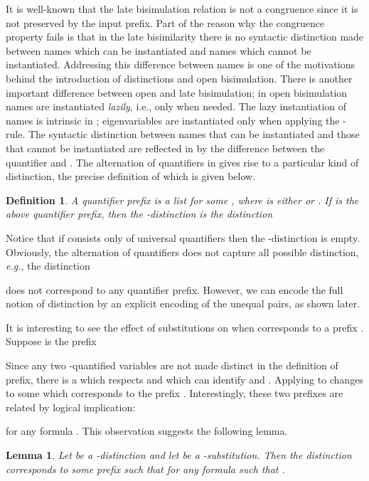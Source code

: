 \documentclass{acmtrans2m}
\newenvironment{definition}{\begin{define} \rm}{\end{define}}
\newtheorem{define}[theorem]{Definition}
\newtheorem{lemma}[theorem]{Lemma}
\begin{document}
It is well-known that the late bisimulation relation is
not a congruence since it is not preserved by the input prefix.
Part of the reason why the congruence property fails 
is that in the late bisimilarity there is no syntactic distinction
made between names which can be instantiated and names which cannot be
instantiated. 
Addressing this difference between names
is one of the motivations behind the introduction 
of distinctions and open bisimulation. 
There is another important
difference between open and late bisimulation; in open bisimulation
names are instantiated {\em lazily}, i.e., only when needed. 
The lazy instantiation of
names is intrinsic in ; eigenvariables are instantiated
only when applying the -rule. 
The syntactic distinction between names that can be instantiated and 
those that cannot be instantiated are reflected in  by the difference between 
the quantifier  and . 
The alternation of quantifiers in  gives rise to
a particular kind of distinction, the precise definition of which
is given below.

\begin{definition}
A {\em quantifier prefix} 
is a list  for some ,
where  is either  or .
If  is the above quantifier prefix, then the
{\em -distinction} is the distinction

\end{definition}
Notice that if  consists only of universal quantifiers
then the -distinction is empty.  Obviously, the
alternation of quantifiers does not capture all possible distinction,
{\em e.g.}, the distinction 

does not correspond to any quantifier prefix.  However, we can encode
the full notion of distinction by an explicit encoding of the unequal
pairs, as shown later.

It is interesting to see the effect of  substitutions on 
when  corresponds to a prefix . 
Suppose  is the prefix 

Since any two -quantified
variables are not made distinct in the definition of  prefix,
there is a  which respects  and which can identify  and .
Applying  to  changes 
 to some  which corresponds to the prefix 
. 
Interestingly, these two prefixes are related by logical implication:

for any formula . This observation suggests the following lemma.

\begin{lemma}
\label{lm:prefix}
Let  be a -distinction and let 
be a -substitution. Then the distinction 
corresponds to some prefix  such that
 for any 
formula  such that .
\end{lemma}
\end{document}
